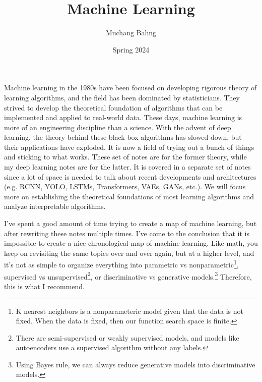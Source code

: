 \documentclass{article}
\begin{document}
\title{Machine Learning}
\author{Muchang Bahng}
\date{Spring 2024}

\maketitle
\tableofcontents
\pagebreak

Machine learning in the 1980s have been focused on developing rigorous theory of learning algorithms, and the field has been dominated by statisticians. They strived to develop the theoretical foundation of algorithms that can be implemented and applied to real-world data. These days, machine learning is more of an engineering discipline than a science. With the advent of deep learning, the theory behind these black box algorithms has slowed down, but their applications have exploded. It is now a field of trying out a bunch of things and sticking to what works. These set of notes are for the former theory, while my deep learning notes are for the latter. It is covered in a separate set of notes since a lot of space is needed to talk about recent developments and architectures (e.g. RCNN, YOLO, LSTMs, Transformers, VAEs, GANs, etc.). We will focus more on establishing the theoretical foundations of most learning algorithms and analyze interpretable algorithms. 

I've spent a good amount of time trying to create a map of machine learning, but after rewriting these notes multiple times. I've come to the conclusion that it is impossible to create a nice chronological map of machine learning. Like math, you keep on revisiting the same topics over and over again, but at a higher level, and it's not as simple to organize everything into parametric vs nonparametric\footnote{K nearest neighbors is a nonparameteric model given that the data is not fixed. When the data is fixed, then our function search space is finite.}, supervised vs unsupervised\footnote{There are semi-supervised or weakly supervised models, and models like autoencoders use a supervised algorithm without any labels.}, or discriminative vs generative models.\footnote{Using Bayes rule, we can always reduce generative models into discriminative models.} Therefore, this is what I recommend. 
\end{document}
